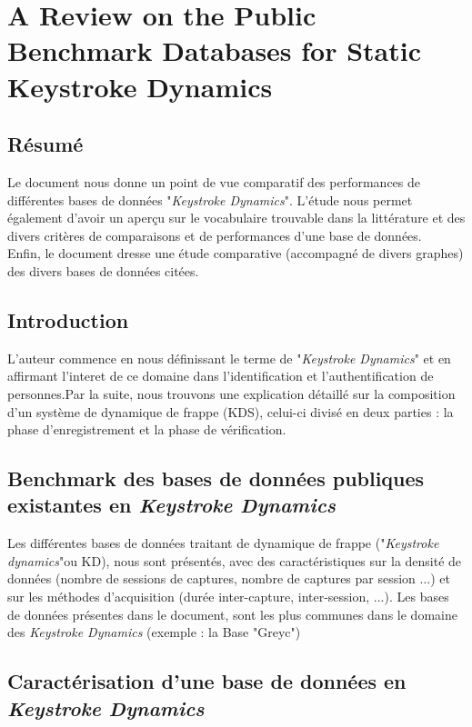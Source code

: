 \section{A Review on the Public Benchmark Databases for Static Keystroke Dynamics\cite{giotBenchmark}}

\subsection{Résumé}

Le document nous donne un point de vue comparatif des performances de différentes bases de données "\textit{Keystroke Dynamics}".    
L'étude nous permet également d'avoir un aperçu sur le vocabulaire trouvable dans la littérature et des divers critères de comparaisons et de performances d'une base de données.\\

Enfin, le document dresse une étude comparative (accompagné de divers graphes) des divers bases de données citées.

\subsection{Introduction}

L'auteur commence en nous définissant le terme de "\textit{Keystroke Dynamics}" et en affirmant l'interet de ce domaine dans l'identification et l'authentification de personnes.Par la suite, nous trouvons une explication détaillé sur la composition d'un système de dynamique de frappe (KDS), celui-ci divisé en deux parties : la phase d'enregistrement et la phase de vérification.

\subsection{Benchmark des bases de données publiques existantes en \textit{Keystroke Dynamics}}

Les différentes bases de données traitant de dynamique de frappe ("\textit{Keystroke dynamics}"ou  KD), nous sont présentés, avec des caractéristiques sur la densité de données (nombre de sessions de captures, nombre de captures par session ...) et sur les méthodes d'acquisition (durée inter-capture, inter-session, ...).  Les bases de données présentes dans le document, sont les plus communes dans le domaine des \textit{Keystroke Dynamics} (exemple : la Base "Greyc")

\subsection{Caractérisation d'une base de données en \textit{Keystroke Dynamics}}


